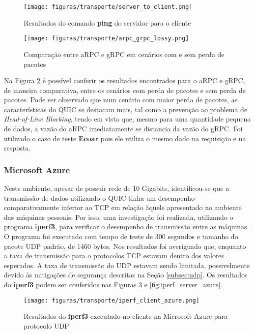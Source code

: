 \begin{figure}[ht]
    \centering
    \caption{Resultados do comando \textbf{ping} do servidor para o cliente}
    \texttt{[image: figuras/transporte/server\_to\_client.png]} 
    \label{fig:server_to_client}
\end{figure}

\begin{figure}[!ht]
    \centering
    \caption{Comparação entre aRPC e gRPC em cenários com e sem perda de pacotes}
    \texttt{[image: figuras/transporte/arpc\_grpc\_lossy.png]} 
    \label{fig:arpc_grpc_lossy}
\end{figure}

Na Figura \ref{fig:arpc_grpc_lossy} é possível conferir os resultados encontrados para o aRPC e gRPC, de maneira comparativa, entre os cenários com perda de pacotes e sem perda de pacotes. Pode ser observado que num cenário com maior perda de pacotes, as características do QUIC se destacam mais, tal como a prevenção ao problema de \textit{Head-of-Line Blocking}, tendo em vista que, mesmo para uma quantidade pequena de dados, a vazão do aRPC imediatamente se distancia da vazão do gRPC. Foi utilizado o caso de teste \textbf{Ecoar} pois ele utiliza o mesmo dado na requisição e na resposta.

\subsubsection{Microsoft Azure}

Neste ambiente, apesar de possuir rede de 10 Gigabits, identificou-se que a transmissão de dados utilizando o QUIC tinha um desempenho comparativamente inferior ao TCP em relação àquele apresentado no ambiente das máquinas pessoais. Por isso, uma investigação foi realizada, utilizando o programa \textbf{iperf3}, para verificar o desempenho de transmissão entre as máquinas. O programa foi executado com tempo de teste de 300 segundos e tamanho do pacote UDP padrão, de 1460 bytes. Nos resultados foi averiguado que, enquanto a taxa de transmissão para o protocolos TCP estavam dentro dos valores esperados. A taxa de transmissão do UDP estavam sendo limitada, possivelmente devido às mitigações de segurança descritas na Seção \ref{subsec:udp}. Os resultados do \textbf{iperf3} podem ser conferidos nas Figuras \ref{fig:iperf_client_azure} e \ref{fig:iperf_server_azure}.

\begin{figure}[ht]
    \centering
    \caption{Resultados do \textbf{iperf3} executado no cliente na Microsoft Azure para protocolo UDP}
    \texttt{[image: figuras/transporte/iperf\_client\_azure.png]} 
    \label{fig:iperf_client_azure}
\end{figure}

